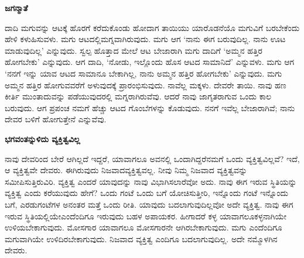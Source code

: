 \begin{center}
\textbf{ಜಗನ್ಮಾತೆ}
\end{center}

\vspace{-0.3cm}

ದಾದಿ ಮಗುವನ್ನು ಆಟಕ್ಕೆ ಹೊರಗೆ ಕರೆದುಕೊಂಡು ಹೋದಾಗ ತಾಯಿಯು ಯಾರೊಡನೆಯೊ ಮಗುವಿಗೆ ಬರಬೇಕೆಂದು ಹೇಳಿ ಕಳುಹಿಸುವಳು. ಮಗು ಆಟದಲ್ಲಿ\break ಮಗ್ನವಾಗಿರುವುದು. ಮಗು ಆಗ ‘ನಾನು ಈಗ ಬರುವುದಿಲ್ಲ. ನಾನು ಊಟ ಮಾಡುವುದಿಲ್ಲ’ ಎನ್ನುವುದು. ಸ್ವಲ್ಪ ಹೊತ್ತಾದ ಮೇಲೆ ಆಟ ಬೇಜಾರಾಗಿ ಮಗು ದಾದಿಗೆ ‘ಅಮ್ಮನ ಹತ್ತಿರ ಹೋಗಬೇಕು’ ಎನ್ನುವುದು. ಆಗ ದಾದಿ, ‘ನೋಡು, ಇಲ್ಲೊಂದು ಹೊಸ ಆಟದ ಸಾಮಾನಿದೆ’ ಎನ್ನುವಳು. ಮಗು ಆಗ ‘ನನಗೆ ಇನ್ನು ಯಾವ ಆಟದ ಸಾಮಾನೂ ಬೇಕಾಗಿಲ್ಲ, ನಾನು ಅಮ್ಮನ ಹತ್ತಿರ ಹೋಗಬೇಕು’ ಎನ್ನುವುದು. ಮಗು ಅಮ್ಮನ ಹತ್ತಿರ ಹೋಗುವವರೆಗೆ ಅಳುವುದಕ್ಕೆ ಪ್ರಾರಂಭಿಸುವುದು. ನಾವೆಲ್ಲ ಮಕ್ಕಳು. ದೇವರೇ ತಾಯಿ. ನಾವು ಹಣ ಕೀರ್ತಿ ಮುಂತಾದುವನ್ನು ಪಡೆಯುವುದರಲ್ಲಿ ಮಗ್ನರಾಗಿರುವೆವು. ಆದರೆ ನಾವು ಜಾಗೃತರಾಗುವ ಒಂದು ಕಾಲ ಬರುವುದು. ಆಗ ಪ್ರಪಂಚ ನಮಗೆ ಹೆಚ್ಚು ಆಟದ ಗೊಂಬೆಗಳನ್ನು ಕೊಡುವುದು. ನನಗೆ ಇವೆಲ್ಲ ಬೇಜಾರಾಗಿವೆ; ನಾನು ದೇವರ ಬಳಿಗೆ ಹೋಗುತ್ತೇನೆ ಎನ್ನುವೆವು.

\vspace{-0.3cm}

\begin{center}
\textbf{ಭಗವಂತನ್ನುಳಿದು ವ್ಯಕ್ತಿತ್ವವಿಲ್ಲ}
\end{center}

\vspace{-0.3cm}

ನಾವು ದೇವರಿಂದ ಬೇರೆ ಆಗಿಲ್ಲದೆ ಇದ್ದರೆ, ಯಾವಾಗಲೂ ಅವನಲ್ಲಿ ಒಂದಾಗಿದ್ದರೆ\break ನಮಗೆ ಒಂದು ವ್ಯಕ್ತಿತ್ವವಿಲ್ಲವೆ? ಇದೆ, ಆ ವ್ಯಕ್ತಿತ್ವವೇ ದೇವರು. ಈಗಿರುವುದು ನಿಜವಾದ\break ವ್ಯಕ್ತಿತ್ವವಲ್ಲ. ನೀವು ನಿಮ್ಮ ನಿಜವಾದ ವ್ಯಕ್ತಿತ್ವವನ್ನು ಸಮೀಪಿಸುತ್ತಿರುವಿರಿ. ವ್ಯಕ್ತಿತ್ವ ಎಂದರೆ ಯಾವುದನ್ನು ನಾವು ವಿಭಾಗಿಸಲಾರೆವೋ ಅದು. ನಾವು ಈಗ ಇರುವ ಸ್ಥಿತಿಯನ್ನು ವ್ಯಕ್ತಿತ್ವ ಎಂದು ಕರೆಯುವುದು ಹೇಗೆ? ಒಂದು ಗಂಟೆ ಒಂದು ಬಗೆ ಯೋಚಿಸುತ್ತೀರಿ, ಇನ್ನೊಂದು ಗಂಟೆ ಇನ್ನೊಂದು ಬಗೆ, ಎರಡುಗಂಟೆಗಳ ಅನಂತರ ಮತ್ತೆ ಒಂದು ರೀತಿ. ಯಾವುದು ಬದಲಾಗುವುದಿಲ್ಲವೋ ಅದೇ ವ್ಯಕ್ತಿತ್ವ. ನಾವು ಈಗ ಇರುವ ಸ್ಥಿತಿಯಲ್ಲಿಯೇ\break ಎಂದೆಂದಿಗೂ ಇರುವುದು ಬಹಳ ಅಪಾಯಕರ. ಹೀಗಾದರೆ ಕಳ್ಳ ಯಾವಾಗಲೂ\break ಕಳ್ಳನಾಗಿಯೇ ಉಳಿಯಬೇಕಾಗುವುದು. ಮೋಸಗಾರ ಯಾವಾಗಲೂ ಮೋಸಗಾರನೇ ಆಗಿರಬೇಕಾಗುವುದು. ಮಗು ಎಂದೆಂದಿಗೂ ಮಗುವಾಗಿಯೇ ಉಳಿದಿರಬೇಕಾಗುವುದು. ನಿಜವಾದ ವ್ಯಕ್ತಿತ್ವ ಎಂದಿಗೂ ಬದಲಾಗುವುದಿಲ್ಲ. ಅದೇ ನಮ್ಮೊಳಗಿನ ದೇವರು.

